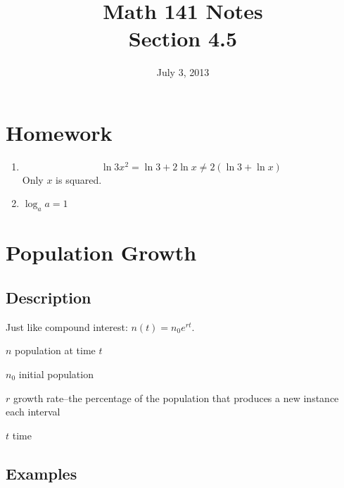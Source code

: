\documentclass{exam}
\title{Math 141 Notes \\ Section 4.5}
\date{July 3, 2013}
\begin{document}
  \maketitle
  \tableofcontents

  \section{Homework}
  \begin{enumerate}
    \item
      \[
        \ln 3x^2 = \ln 3 + 2 \ln x \neq 2 \left( \ln 3 + \ln x \right)
      \]
      Only $x$ is squared.

    \item $\log_a a = 1$

  \end{enumerate}

  \section{Population Growth}

  \subsection{Description}
  Just like compound interest: $n(t) = n_0 e^{rt}$.

  \begin{itemize*}
    \item $n$ population at time $t$
    \item $n_0$ initial population
    \item $r$ growth rate--the percentage of the population that produces a new instance each interval
    \item $t$ time
  \end{itemize*}

  \subsection{Examples}
\end{document}
